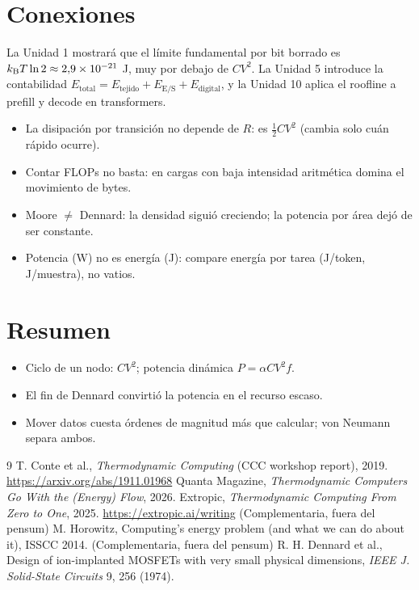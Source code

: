 \documentclass[11pt,a4paper]{article}
\begin{document}
\section{Conexiones}
La Unidad 1 mostrará que el límite fundamental por bit borrado es $k_{\mathrm B} T\ln2\approx2{,}9\times10^{-21}$ J,
muy por debajo de $CV^2$. La Unidad 5 introduce la contabilidad
$E_{\text{total}}=E_{\text{tejido}}+E_{\text{E/S}}+E_{\text{digital}}$, y la Unidad 10 aplica el roofline a
prefill y decode en transformers.

\begin{error}
\begin{itemize}[nosep]
\item La disipación por transición no depende de $R$: es $\tfrac12CV^2$ (cambia solo cuán rápido ocurre).
\item Contar FLOPs no basta: en cargas con baja intensidad aritmética domina el movimiento de bytes.
\item Moore $\neq$ Dennard: la densidad siguió creciendo; la potencia por área dejó de ser constante.
\item Potencia (W) no es energía (J): compare energía por tarea (J/token, J/muestra), no vatios.
\end{itemize}
\end{error}

\section{Resumen}
\begin{itemize}[nosep]
\item Ciclo de un nodo: $CV^2$; potencia dinámica $P=\alpha CV^2f$.
\item El fin de Dennard convirtió la potencia en el recurso escaso.
\item Mover datos cuesta órdenes de magnitud más que calcular; von Neumann separa ambos.
\end{itemize}

\begin{thebibliography}{9}\small
{} T. Conte et al., \emph{Thermodynamic Computing} (CCC workshop report), 2019. \url{https://arxiv.org/abs/1911.01968}
 Quanta Magazine, \emph{Thermodynamic Computers Go With the (Energy) Flow}, 2026.
 Extropic, \emph{Thermodynamic Computing From Zero to One}, 2025. \url{https://extropic.ai/writing}
 (Complementaria, fuera del pensum) M. Horowitz, Computing's energy problem (and what we can do about it), ISSCC 2014.
 (Complementaria, fuera del pensum) R. H. Dennard et al., Design of ion-implanted MOSFETs with very small physical dimensions, \emph{IEEE J. Solid-State Circuits} 9, 256 (1974).
\end{thebibliography}
\end{document}
